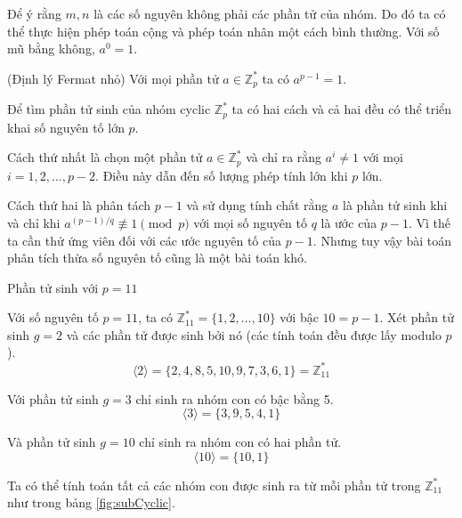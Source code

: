 \documentclass[../main.tex]{subfiles}
\begin{document}
Để ý rằng $m,n$ là các số nguyên không phải các phần tử của nhóm. Do đó ta có thể thực hiện phép toán cộng và phép toán nhân một cách bình thường. Với số mũ bằng không, $a^0 =1$.

\begin{dl}
(Định lý Fermat nhỏ) Với mọi phần tử $a \in \mathbb{Z}^*_p$ ta có $a^{p-1} = 1$. 
\end{dl}

Để tìm phần tử sinh của nhóm cyclic $\mathbb{Z}^*_p$ ta có hai cách và cả hai đều có thể triển khai số nguyên tố lớn $p$. 

Cách thứ nhất là chọn một phần tử $a \in \mathbb{Z}^*_p$ và chỉ ra rằng $a^i \neq 1$ với mọi $i = 1,2,...,p-2$. Điều này dẫn đến số lượng phép tính lớn khi $p$ lớn.

Cách thứ hai là phân tách $p-1$ và sử dụng tính chất rằng $a$ là phần tử sinh khi và chỉ khi $a^{(p-1)/q} \not\equiv 1\pmod  p$ với mọi số nguyên tố $q$ là ước của $p-1$. Vì thế ta cần thử ứng viên đối với các ước nguyên tố của $p-1$. Nhưng tuy vậy bài toán phân tích thừa số nguyên tố cũng là một bài toán khó.

\begin{vd} Phần tử sinh với $p = 11$
\end{vd}

Với số nguyên tố $p =11$, ta có $\mathbb{Z}^*_{11} = \{1,2,...,10\}$ với bậc $10 = p-1$.
Xét phần tử sinh $g = 2$ và các phần tử được sinh bởi nó (các tính toán đều được lấy modulo $p$).
$$ \langle 2 \rangle = \{ 2,4,8,5,10,9,7,3,6,1\} = \mathbb{Z}^*_{11}
$$

Với phần tử sinh $g = 3$ chỉ sinh ra nhóm con có bậc bằng 5.
$$ \langle 3 \rangle = \{3,9,5,4,1\} 
$$

Và phần tử sinh $g = 10$ chỉ sinh ra nhóm con có hai phần tử.
$$ \langle 10 \rangle = \{10,1\} 
$$

Ta có thể tính toán tất cả các nhóm con được sinh ra từ mỗi phần tử trong $\mathbb{Z}^*_{11}$ như trong bảng \ref{fig:subCyclic}.
\end{document}
